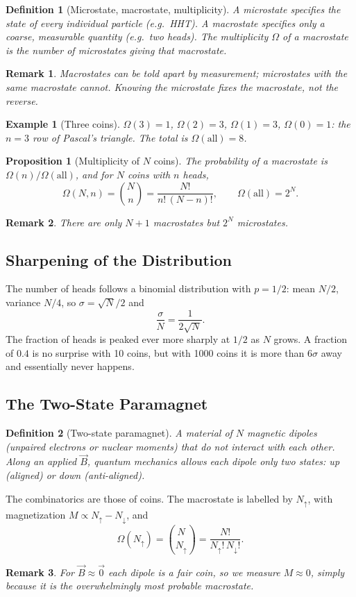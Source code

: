 \documentclass{article}
\newtheorem{definition}{Definition}
\newtheorem*{example}{Example}
\newtheorem{remark}{Remark}
\newtheorem{proposition}{Proposition}
\begin{document}
\begin{definition}[Microstate, macrostate, multiplicity]
    A microstate specifies the state of every individual particle (e.g.\ HHT). A macrostate specifies only a coarse, measurable quantity (e.g.\ two heads). The multiplicity $\Omega$ of a macrostate is the number of microstates giving that macrostate.
\end{definition}
\begin{remark}
    Macrostates can be told apart by measurement; microstates with the same macrostate cannot. Knowing the microstate fixes the macrostate, not the reverse.
\end{remark}
\begin{example}[Three coins]
    $\Omega(3) = 1$, $\Omega(2) = 3$, $\Omega(1) = 3$, $\Omega(0) = 1$: the $n = 3$ row of Pascal's triangle. The total is $\Omega(\text{all}) = 8$.
\end{example}

\begin{proposition}[Multiplicity of $N$ coins]
    The probability of a macrostate is $\Omega(n)/\Omega(\text{all})$, and for $N$ coins with $n$ heads,
    \[\Omega(N, n) = \binom{N}{n} = \frac{N!}{n!\,(N-n)!}, \qquad \Omega(\text{all}) = 2^N.\]
\end{proposition}
\begin{remark}
    There are only $N+1$ macrostates but $2^N$ microstates.
\end{remark}

\subsection{Sharpening of the Distribution}
The number of heads follows a binomial distribution with $p = 1/2$: mean $N/2$, variance $N/4$, so $\sigma = \sqrt{N}/2$ and
\[\frac{\sigma}{N} = \frac{1}{2\sqrt{N}}.\]
The fraction of heads is peaked ever more sharply at $1/2$ as $N$ grows. A fraction of $0.4$ is no surprise with 10 coins, but with 1000 coins it is more than $6\sigma$ away and essentially never happens.

\subsection{The Two-State Paramagnet}
\begin{definition}[Two-state paramagnet]
    A material of $N$ magnetic dipoles (unpaired electrons or nuclear moments) that do not interact with each other. Along an applied $\vec{B}$, quantum mechanics allows each dipole only two states: up (aligned) or down (anti-aligned).
\end{definition}
The combinatorics are those of coins. The macrostate is labelled by $N_\uparrow$, with magnetization $M \propto N_\uparrow - N_\downarrow$, and
\[\Omega(N_\uparrow) = \binom{N}{N_\uparrow} = \frac{N!}{N_\uparrow!\,N_\downarrow!}.\]
\begin{remark}
    For $\vec{B} \approx \vec{0}$ each dipole is a fair coin, so we measure $M \approx 0$, simply because it is the overwhelmingly most probable macrostate.
\end{remark}
\end{document}
